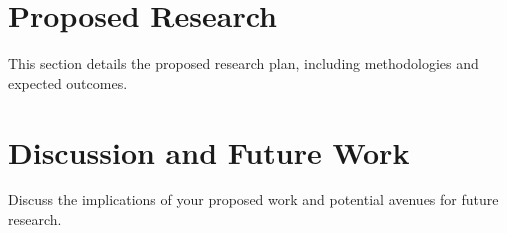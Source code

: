\documentclass[12pt]{article}
\begin{document}
\section{Proposed Research}
\label{sec:proposed-research}
This section details the proposed research plan, including methodologies and expected outcomes.

\section{Discussion and Future Work}
\label{sec:discussion}
Discuss the implications of your proposed work and potential avenues for future research.

\end{document}
